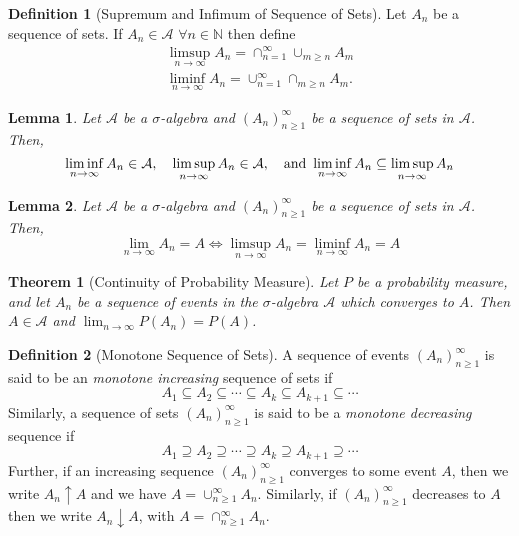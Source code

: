 \documentclass{article}
\newtheorem{theorem}{Theorem}[section]
\newtheorem{lemma}{Lemma}[section]
\theoremstyle{definition}
\newtheorem{definition}{Definition}[section]
\theoremstyle{remark}
\begin{document}
\begin{definition}[Supremum and Infimum of Sequence of Sets]\label{def:sup and inf of sequence of sets}
Let $A_n$ be a sequence of sets. If $A_n \in \mathcal{A}$ $\forall n \in \mathbb{N}$ then define
\begin{gather*}
\limsup_{n\to\infty}{A_n} = \cap^\infty_{n=1}\cup_{m \geq n}{A_m}\\
\liminf_{n\to\infty}{A_n} = \cup^\infty_{n=1}\cap_{m\geq n}{A_m}.
\end{gather*}

\end{definition}




\begin{lemma}\label{lem:inf subset of sup}
Let $\mathcal{A}$ be a $\sigma$-algebra and $(A_n)^\infty_{n\geq 1}$ be a sequence 
of sets in $\mathcal{A}$. Then, \[
\liminf_{n\to\infty}{A_n} \in \mathcal{A}, \quad \limsup_{n\to\infty}{A_n} \in \mathcal{A}, \quad \textnormal{and } \liminf_{n\to\infty}{A_n} \subseteq \limsup_{n\to\infty}{A_n}
\]
\end{lemma}





\begin{lemma}\label{lem:sup equal inf mean converge}
Let $\mathcal{A}$ be a $\sigma$-algebra and $(A_n)^\infty_{n\geq 1}$ be a sequence 
of sets in $\mathcal{A}$. Then, \[
\lim_{n\to\infty}{A_n}=A \iff \limsup_{n\to\infty}{A_n} = \liminf_{n\to\infty}{A_n} = A
\]
\end{lemma}





\begin{theorem}[Continuity of Probability Measure]
Let $P$ be a probability measure, and let $A_n$ be a sequence of events in the $\sigma$-algebra $\mathcal{A}$
which converges to $A$. Then $A \in \mathcal{A}$ and $\lim_{n\to\infty}{P(A_n)} = P(A)$.
\end{theorem}



\begin{definition}[Monotone Sequence of Sets]\label{def:Increasing or Decreasing Sequence of Sets}
A sequence of events $(A_n)^\infty_{n\geq 1}$ is said to be an \textit{monotone increasing} sequence of sets if \[
A_1 \subseteq A_2 \subseteq \cdots \subseteq A_k \subseteq A_{k+1} \subseteq \cdots
\]
Similarly, a sequence of sets $(A_n)^\infty_{n\geq 1}$ is said to be a \textit{monotone decreasing} sequence if \[
A_1 \supseteq A_2 \supseteq \cdots \supseteq A_k \supseteq A_{k+1} \supseteq \cdots
\]
Further, if an increasing sequence $(A_n)^\infty_{n\geq 1}$ converges to some event $A$, then we write $A_n \uparrow A$ and we have $A = \cup^\infty_{n\geq 1}{A_n}$. Similarly, 
if $(A_n)^\infty_{n\geq 1}$ decreases to $A$ then we write $A_n \downarrow A$, with  $A = \cap^\infty_{n\geq 1}{A_n}$.
\end{definition}
\end{document}
